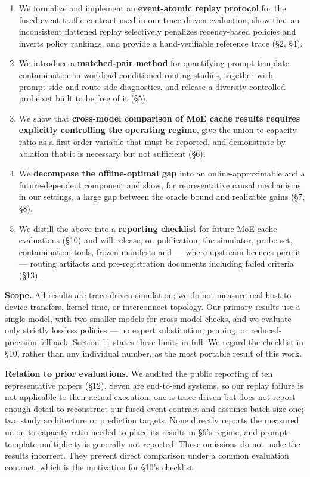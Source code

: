 \documentclass[
  10pt,
  letterpaper,
  10pt]{article}
\providecommand{\tightlist}{%
  \setlength{\itemsep}{0pt}\setlength{\parskip}{0pt}}
\begin{document}
\begin{enumerate}
\def\labelenumi{\arabic{enumi}.}
\tightlist
\item
  We formalize and implement an \textbf{event-atomic replay protocol}
  for the fused-event traffic contract used in our trace-driven
  evaluation, show that an inconsistent flattened replay selectively
  penalizes recency-based policies and inverts policy rankings, and
  provide a hand-verifiable reference trace (§2, §4).
\item
  We introduce a \textbf{matched-pair method} for quantifying
  prompt-template contamination in workload-conditioned routing studies,
  together with prompt-side and route-side diagnostics, and release a
  diversity-controlled probe set built to be free of it (§5).
\item
  We show that \textbf{cross-model comparison of MoE cache results
  requires explicitly controlling the operating regime}, give the
  union-to-capacity ratio as a first-order variable that must be
  reported, and demonstrate by ablation that it is necessary but not
  sufficient (§6).
\item
  We \textbf{decompose the offline-optimal gap} into an
  online-approximable and a future-dependent component and show, for
  representative causal mechanisms in our settings, a large gap between
  the oracle bound and realizable gains (§7, §8).
\item
  We distill the above into a \textbf{reporting checklist} for future
  MoE cache evaluations (§10) and will release, on publication, the
  simulator, probe set, contamination tools, frozen manifests and ---
  where upstream licences permit --- routing artifacts and
  pre-registration documents including failed criteria (§13).
\end{enumerate}

\textbf{Scope.} All results are trace-driven simulation; we do not
measure real host-to-device transfers, kernel time, or interconnect
topology. Our primary results use a single model, with two smaller
models for cross-model checks, and we evaluate only strictly lossless
policies --- no expert substitution, pruning, or reduced-precision
fallback. Section 11 states these limits in full. We regard the
checklist in §10, rather than any individual number, as the most
portable result of this work.

\textbf{Relation to prior evaluations.} We audited the public reporting
of ten representative papers (§12). Seven are end-to-end systems, so our
replay failure is not applicable to their actual execution; one is
trace-driven but does not report enough detail to reconstruct our
fused-event contract and assumes batch size one; two study architecture
or prediction targets. None directly reports the measured
union-to-capacity ratio needed to place its results in §6's regime, and
prompt-template multiplicity is generally not reported. These omissions
do not make the results incorrect. They prevent direct comparison under
a common evaluation contract, which is the motivation for §10's
checklist.
\end{document}
